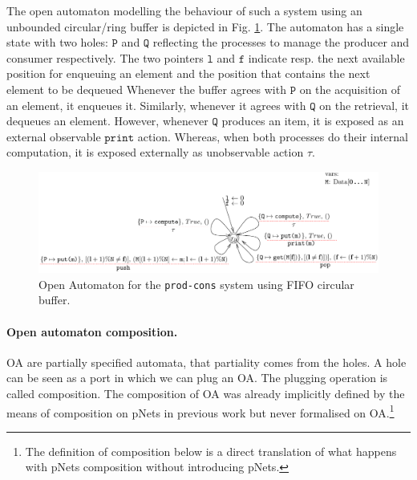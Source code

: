 \documentclass[runningheads]{llncs}
\begin{document}
\begin{example}
The open automaton  modelling the behaviour of such a system  using an  unbounded circular/ring buffer is depicted in Fig. \ref{Fig:RefineOA}.  The automaton has a single state with  two holes: $\texttt{P}$ and  $\texttt{Q}$ reflecting the processes to manage the producer and consumer respectively.  The two pointers $\texttt{l}$ and $\texttt{f}$  indicate resp. the next available position for  enqueuing an element  and the position that contains the next element to be dequeued %
Whenever the buffer agrees with $\texttt{P}$ on the acquisition of an element, it enqueues it. Similarly, whenever it agrees with $\texttt{Q}$ on the retrieval, it dequeues an element. However, whenever $\texttt{Q}$ produces an item, it is exposed as an external observable  $\texttt{print}$ action. Whereas, when both processes do their internal computation, it is exposed externally as unobservable action $\tau$. 
\begin{figure}[h]
 \centering
   \includegraphics[width=.99\textwidth]{Figures/FIFORing.pdf}
   \caption{Open Automaton for the \texttt{prod-cons} system using FIFO circular buffer.
    \label{Fig:RefineOA}} 
\end{figure}

\end{example}


\medskip
{}



\paragraph{Open automaton composition.}

OA are partially specified automata, that partiality comes  from the holes.
A hole can be seen as a port in which we can plug an OA.
The plugging operation is called composition.
The composition of OA was already implicitly defined by the means of composition on pNets in previous work \cite{henrio:01299562} but never  formalised on OA.\footnote{The definition of composition below is a direct translation of what happens with pNets composition \cite{henrio:01299562} without  introducing pNets.}
\end{document}
